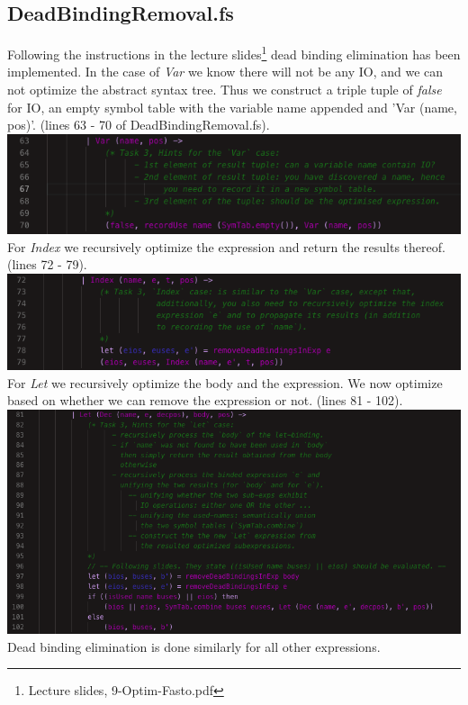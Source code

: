 \subsection{DeadBindingRemoval.fs}
Following the instructions in the lecture slides\footnote{Lecture slides, 9-Optim-Fasto.pdf} dead binding elimination has been implemented. In the case of \textit{Var} we know there will not be any IO, and we can not optimize the abstract syntax tree. Thus we construct a triple tuple of \textit{false} for IO, an empty symbol table with the variable name appended and 'Var (name, pos)'. (lines 63 - 70 of DeadBindingRemoval.fs).\\
\includegraphics[width=\linewidth]{Materials/Optimization/VarDBE}\\
For \textit{Index} we recursively optimize the expression and return the results thereof. (lines 72 - 79).\\
\includegraphics[width=\linewidth]{Materials/Optimization/IndexDBE}\\
For \textit{Let} we recursively optimize the body and the expression. We now optimize based on whether we can remove the expression or not. (lines 81 - 102).\\
\includegraphics[width=\linewidth]{Materials/Optimization/LetDBE}\\
Dead binding elimination is done similarly for all other expressions.
